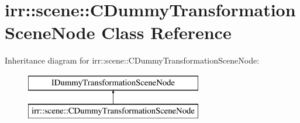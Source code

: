 \hypertarget{classirr_1_1scene_1_1_c_dummy_transformation_scene_node}{\section{irr\-:\-:scene\-:\-:C\-Dummy\-Transformation\-Scene\-Node Class Reference}
\label{classirr_1_1scene_1_1_c_dummy_transformation_scene_node}
}
Inheritance diagram for irr\-:\-:scene\-:\-:C\-Dummy\-Transformation\-Scene\-Node\-:\begin{figure}[H]
\begin{center}
\leavevmode
\includegraphics[height=2.000000cm]{classirr_1_1scene_1_1_c_dummy_transformation_scene_node}
\end{center}
\end{figure}

